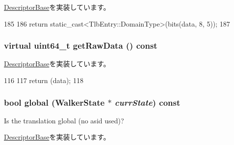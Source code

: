\hyperlink{classArmISA_1_1TableWalker_1_1DescriptorBase_af3d561535442b70040e5fd7ff04eff12}{DescriptorBase}を実装しています。


\begin{DoxyCode}
185         {
186             return static_cast<TlbEntry::DomainType>(bits(data, 8, 5));
187         }
\end{DoxyCode}
\hypertarget{classArmISA_1_1TableWalker_1_1L1Descriptor_a22438a8aab2360360239d433b2f8fc50}{
\subsubsection[{getRawData}]{\setlength{\rightskip}{0pt plus 5cm}virtual uint64\_\-t getRawData () const}}
\label{classArmISA_1_1TableWalker_1_1L1Descriptor_a22438a8aab2360360239d433b2f8fc50}


\hyperlink{classArmISA_1_1TableWalker_1_1DescriptorBase_a2d8a1d7c99e0e52420d8be6cbd821697}{DescriptorBase}を実装しています。


\begin{DoxyCode}
116         {
117             return (data);
118         }
\end{DoxyCode}
\hypertarget{classArmISA_1_1TableWalker_1_1L1Descriptor_ad6798ebc36be05efa22b3fb9f3702d83}{
\subsubsection[{global}]{\setlength{\rightskip}{0pt plus 5cm}bool global ({\bf WalkerState} $\ast$ {\em currState}) const}}
\label{classArmISA_1_1TableWalker_1_1L1Descriptor_ad6798ebc36be05efa22b3fb9f3702d83}
Is the translation global (no asid used)? 

\hyperlink{classArmISA_1_1TableWalker_1_1DescriptorBase_a87704122ae25a982d2e3d92c5b0e9c25}{DescriptorBase}を実装しています。


